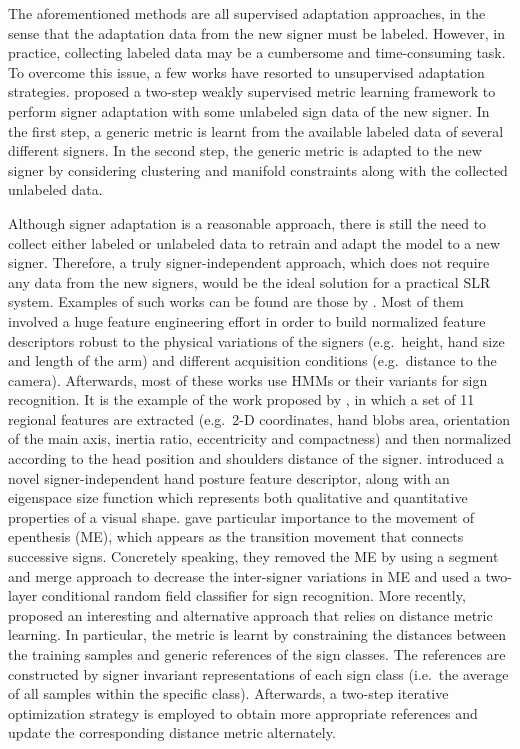 The aforementioned methods are all supervised adaptation approaches, in the sense that the adaptation data from the new signer must be labeled. However, in practice, collecting labeled data may be a cumbersome and time-consuming task. To overcome this issue, a few works have resorted to unsupervised adaptation strategies. \citet{Yin2015} proposed a two-step weakly supervised metric learning framework to perform signer adaptation with some unlabeled sign data of the new signer. In the first step, a generic metric is learnt from the available labeled data of several different signers. In the second step, the generic metric is adapted to the new signer by considering clustering and manifold constraints along with the collected unlabeled data.

Although signer adaptation is a reasonable approach, there is still the need to collect either labeled or unlabeled data to retrain and adapt the model to a new signer. Therefore, a truly signer-independent approach, which does not require any data from the new signers, would be the ideal solution for a practical SLR system. Examples of such works can be found are those by \citet{Zieren2005, Shanableh2011, Agris2008b, Kong2014, Kelly2010, Dahmani2014, Yin2016}. Most of them involved a huge feature engineering effort in order to build normalized feature descriptors robust to the physical variations of the signers (e.g.\ height, hand size and length of the arm) and different acquisition conditions (e.g.\ distance to the camera). Afterwards, most of these works use HMMs or their variants for sign recognition. It is the example of the work proposed by \citet{Agris2008b}, in which a set of 11 regional features are extracted (e.g.\ 2-D coordinates, hand blobs area, orientation of the main axis, inertia ratio, eccentricity and compactness) and then normalized according to the head position and shoulders distance of the signer. \citet{Kelly2010} introduced a novel signer-independent hand posture feature descriptor, along with an eigenspace size function which represents both qualitative and quantitative properties of a visual shape. \citet{Kong2014} gave particular importance to the movement of epenthesis (ME), which appears as the transition movement that connects successive signs. Concretely speaking, they removed the ME by using a segment and merge approach to decrease the inter-signer variations in ME and used a two-layer conditional random field classifier for sign recognition. More recently, \citet{Yin2016} proposed an interesting and alternative approach that relies on distance metric learning. In particular, the metric is learnt by constraining the distances between the training samples and generic references of the sign classes. The references are constructed by signer invariant representations of each sign class (i.e.\ the average of all samples within the specific class). Afterwards, a two-step iterative optimization strategy is employed to obtain more appropriate references and update the corresponding distance metric alternately.

